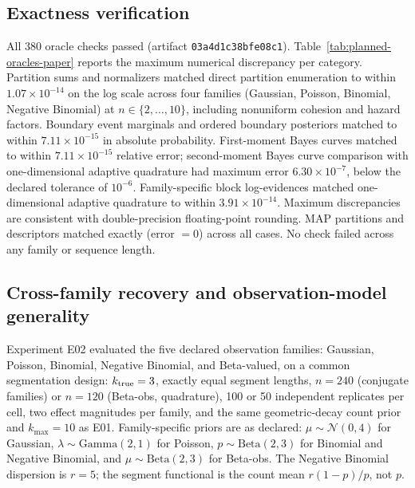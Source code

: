 

\FloatBarrier
\subsection{Exactness verification}
\label{sec:e00}
All 380 oracle checks passed (artifact \texttt{03a4d1c38bfe08c1}). Table~\ref{tab:planned-oracles-paper} reports the maximum numerical discrepancy per category. Partition sums and normalizers matched direct partition enumeration to within $1.07\times10^{-14}$ on the log scale across four families (Gaussian, Poisson, Binomial, Negative Binomial) at $n\in\{2,\ldots,10\}$, including nonuniform cohesion and hazard factors. Boundary event marginals and ordered boundary posteriors matched to within $7.11\times10^{-15}$ in absolute probability. First-moment Bayes curves matched to within $7.11\times10^{-15}$ relative error; second-moment Bayes curve comparison with one-dimensional adaptive quadrature had maximum error $6.30\times10^{-7}$, below the declared tolerance of $10^{-6}$. Family-specific block log-evidences matched one-dimensional adaptive quadrature to within $3.91\times10^{-14}$. Maximum discrepancies are consistent with double-precision floating-point rounding. MAP partitions and descriptors matched exactly (error $= 0$) across all cases. No check failed across any family or sequence length.

\subsection{Cross-family recovery and observation-model generality}
Experiment E02 evaluated the five declared observation families: Gaussian, Poisson, Binomial, Negative Binomial, and Beta-valued, on a common segmentation design: $k_{\rm true}=3$, exactly equal segment lengths, $n=240$ (conjugate families) or $n=120$ (Beta-obs, quadrature), 100 or 50 independent replicates per cell, two effect magnitudes per family, and the same geometric-decay count prior and $k_{\max}=10$ as E01. Family-specific priors are as declared: $\mu\sim\mathcal{N}(0,4)$ for Gaussian, $\lambda\sim\mathrm{Gamma}(2,1)$ for Poisson, $p\sim\mathrm{Beta}(2,3)$ for Binomial and Negative Binomial, and $\mu\sim\mathrm{Beta}(2,3)$ for Beta-obs. The Negative Binomial dispersion is $r=5$; the segment functional is the count mean $r(1-p)/p$, not $p$.

